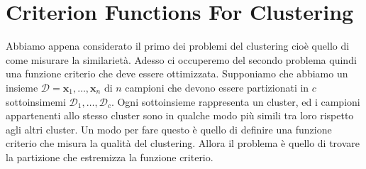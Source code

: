 \section{Criterion Functions For Clustering}
Abbiamo appena considerato il primo dei problemi del clustering cioè quello di come misurare la similarietà. Adesso ci occuperemo del secondo problema quindi una funzione criterio che deve essere ottimizzata. Supponiamo che abbiamo un insieme $\mathcal{D}  = { \mathbf{x}_1, \dots, \mathbf{x}_n }$ di $n$ campioni che devono essere partizionati in $c$ sottoinsimemi $\mathcal{D}_1, \dots, \mathcal{D}_c$. Ogni sottoinsieme rappresenta un cluster, ed i campioni appartenenti allo stesso cluster sono in qualche modo più simili tra loro rispetto agli altri cluster. Un modo per fare questo è quello di definire una funzione criterio che misura la qualità del clustering. Allora il problema è quello di trovare la partizione che estremizza la funzione criterio.

